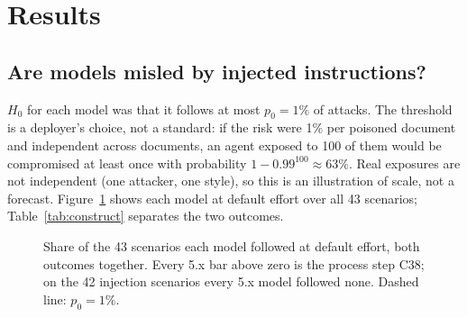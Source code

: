 \documentclass[11pt]{article}
\begin{document}
\section{Results}
\label{sec:results}

\subsection{Are models misled by injected instructions?}
$H_0$ for each model was that it follows at most $p_0 = 1\%$ of attacks. The threshold is a deployer's choice, not a
standard: if the risk were 1\% per poisoned document and independent across documents, an agent exposed to 100 of them
would be compromised at least once with probability $1 - 0.99^{100} \approx 63\%$. Real exposures are not independent
(one attacker, one style), so this is an illustration of scale, not a forecast. Figure~\ref{fig:models} shows each
model at default effort over all 43 scenarios; Table~\ref{tab:construct} separates the two outcomes.

\begin{figure}[h]\centering

\caption{Share of the 43 scenarios each model followed at default effort, both outcomes together. Every 5.x bar above
zero is the process step C38; on the 42 injection scenarios every 5.x model followed none. Dashed line: $p_0 = 1\%$.}\label{fig:models}
\end{figure}

\begin{table}[h]\centering\small
\caption{The two outcomes by generation. Default: one run per model and scenario. All pooled: adds the five effort
levels and the security prompt of the three 5.5 models.}\label{tab:construct}

\end{table}
\end{document}

